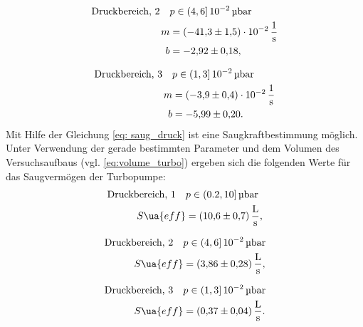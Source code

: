 \begin{align}
  \label{eq: regression_turbo_druck_2}
  \begin{aligned}
  \text{Druckbereich, 2} \quad  &p\in(4,6]\,\num{e-2}\,\si{\micro\bar} \\
  m&=\SI{-41.3\pm1.5 e-2}{\per\second} \\
  b&=\num{-2.92 \pm0.18 },
\end{aligned}
\end{align}

\begin{align}
  \label{eq: regression_turbo_druck_3}
  \begin{aligned}
  \text{Druckbereich, 3} \quad  &p\in(1,3]\,\num{e-2}\,\si{\micro\bar} \\
  m&=\SI{-3.9\pm0.4 e-2}{\per\second} \\
  b&=\num{-5.99 \pm0.20 }.
\end{aligned}
\end{align}
Mit Hilfe der Gleichung \eqref{eq: saug_druck} ist eine Saugkraftbestimmung möglich.
Unter Verwendung der gerade bestimmten Parameter und dem Volumen des Versuchsaufbaus
(vgl. \eqref{eq:volume_turbo}) ergeben sich die folgenden Werte für das Saugvermögen der Turbopumpe:
\begin{align}
  \label{eq:turbo_saug_1}
  \begin{aligned}
    \text{Druckbereich, 1} \quad  &p\in(0.2,10]\,\si{\micro\bar} \\
   S\ua{eff}&=\SI{10.6\pm 0.7}{\litre\per\second},
\end{aligned}
\end{align}

\begin{align}
  \label{eq:turbo_saug_2}
  \begin{aligned}
  \text{Druckbereich, 2} \quad  &p\in(4,6]\,\num{e-2}\,\si{\micro\bar} \\
   S\ua{eff}&=\SI{3.86\pm 0.28}{\litre\per\second},
\end{aligned}
\end{align}

\begin{align}
  \label{eq:turbo_saug_3}
  \begin{aligned}
    \text{Druckbereich, 3} \quad  &p\in(1,3]\,\num{e-2}\,\si{\micro\bar} \\
   S\ua{eff}&=\SI{0.37\pm 0.04}{\litre\per\second}.
\end{aligned}
\end{align}

